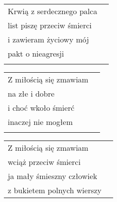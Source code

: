 \documentclass[a5paper]{article}
\begin{document}
\noindent
{}
\noindent
\begin{tabular}{@{}p{6.50cm}p{3cm}@{}}
Krwią z serdecznego palca\\
list piszę przeciw śmierci\\
i zawieram życiowy mój\\
pakt o nieagresji\\\\
\end{tabular}

\noindent
{}
\begin{tabular}{@{}p{7.50cm}p{3cm}@{}}
\noindent
Z miłością się zmawiam\\
na złe i dobre\\
i choć wkoło śmierć\\
inaczej nie mogłem\\\\
\end{tabular}

\noindent
{}
\noindent
\begin{tabular}{@{}p{6.50cm}p{3cm}@{}}
Z miłością się zmawiam\\
wciąż przeciw śmierci\\
ja mały śmieszny człowiek\\
z bukietem polnych wierszy
\end{tabular}
\end{document}

